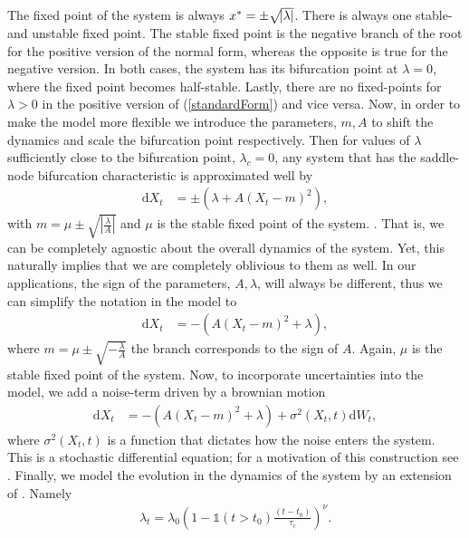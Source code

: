 The fixed point of the system is always $x^* = \pm\sqrt{\abs{\lambda}}$. There is always one stable- and unstable fixed point. The stable fixed point is the negative branch of the root for the positive version of the normal form, whereas the opposite is true for the negative version. In both cases, the system has its bifurcation point at $\lambda = 0$, where the fixed point becomes half-stable. Lastly, there are no fixed-points for $\lambda>0$ in the positive version of (\ref{standardForm}) and vice versa. Now, in order to make the model more flexible we introduce the parameters, $m, A$ to shift the dynamics and scale the bifurcation point respectively. Then for values of $\lambda$ sufficiently close to the bifurcation point, $\lambda_c = 0$, any system that has the saddle-node bifurcation characteristic is approximated well by 
\begin{align}
    \mathrm{d}X_t &= \pm\left(\lambda + A\left(X_t - m\right)^2\right), 
\end{align}
with $m = \mu \pm \sqrt{\left|\frac{\lambda}{A}\right|}$ and $\mu$ is the stable fixed point of the system. \cite{Ditlevsen2023}. That is, we can be completely agnostic about the overall dynamics of the system. Yet, this naturally implies that we are completely oblivious to them as well. In our applications, the sign of the parameters, $A, \lambda$, will always be different, thus we can simplify the notation in the model to
\begin{align}
    \mathrm{d}X_t &= -\left(A\left(X_t - m\right)^2 + \lambda\right), 
\end{align}
where $m = \mu \pm \sqrt{-\frac{\lambda}{A}}$ the branch corresponds to the sign of $A$. Again, $\mu$ is the stable fixed point of the system. Now, to incorporate uncertainties into the model, we add a noise-term driven by a brownian motion
\begin{align}
    \mathrm{d}X_t &= -\left(A\left(X_t - m\right)^2 + \lambda\right) + \sigma^2(X_t, t)\mathrm{d}W_t, \label{eq:dynamicsOriginal}
\end{align}
where $\sigma^2(X_t, t)$ is a function that dictates how the noise enters the system. This is a stochastic differential equation; for a motivation of this construction see \cite[Chapter 3.1-3.2]{Srkk2019}. Finally, we model the evolution in the dynamics of the system by an extension of \cite[Equation (2)]{Ditlevsen2023}. Namely
\begin{align}
    \lambda_t = \lambda_0\left(1 - \mathds{1}\left(t>t_0\right)\frac{\left(t - t_0\right)}{\tau_c}\right)^\nu \label{eq:lambda_t}.
\end{align}
